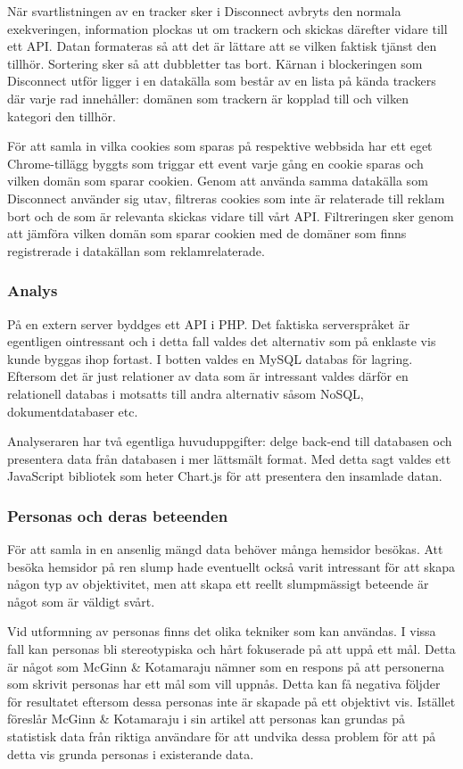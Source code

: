 \documentclass[a4paper,11pt]{article}
\begin{document}
{När svartlistningen av en tracker sker i Disconnect avbryts den normala exekveringen, information plockas ut om trackern och skickas därefter vidare till ett API. Datan formateras så att det är lättare att se vilken faktisk tjänst den tillhör. Sortering sker så att dubbletter tas bort. Kärnan i blockeringen som Disconnect utför ligger i en datakälla som består av en lista på kända trackers där varje rad innehåller: domänen som trackern är kopplad till och vilken kategori den tillhör. 

För att samla in vilka cookies som sparas på respektive webbsida har ett eget Chrome-tillägg byggts som triggar ett event varje gång en cookie sparas och vilken domän som sparar cookien. Genom att använda samma datakälla som Disconnect använder sig utav, filtreras cookies som inte är relaterade till reklam bort och de som är relevanta skickas vidare till vårt API. Filtreringen sker genom att jämföra vilken domän som sparar cookien med de domäner som finns registrerade i datakällan som reklamrelaterade.

\subsubsection{Analys}
På en extern server byddges ett API i PHP. Det faktiska serverspråket är egentligen  ointressant och i detta fall valdes det alternativ som på enklaste vis kunde byggas ihop fortast. I botten valdes en MySQL databas för lagring. Eftersom det är just relationer av data som är intressant valdes därför en relationell databas i motsatts till andra alternativ såsom NoSQL, dokumentdatabaser etc. 

Analyseraren har två egentliga huvuduppgifter: delge back-end till databasen och presentera data från databasen i mer lättsmält format. Med detta sagt valdes ett JavaScript bibliotek som heter Chart.js \cite{Downie} för att presentera den insamlade datan. 

\subsubsection{Personas och deras beteenden}
För att samla in en ansenlig mängd data behöver många hemsidor besökas. Att besöka hemsidor på ren slump hade eventuellt också varit intressant för att skapa någon typ av objektivitet, men att skapa ett reellt slumpmässigt beteende är något som är väldigt svårt.

Vid utformning av personas finns det olika tekniker som kan användas. I vissa fall kan personas bli stereotypiska och hårt fokuserade på att uppå ett mål. Detta är något som McGinn \& Kotamaraju \cite{McGinn} nämner som en respons på att personerna som skrivit personas har ett mål som vill uppnås. Detta kan få negativa följder för resultatet eftersom dessa personas inte är skapade på ett objektivt vis. Istället föreslår McGinn \& Kotamaraju \cite{McGinn} i sin artikel att personas kan grundas på statistisk data från riktiga användare för att undvika dessa problem för att på detta vis grunda personas i existerande data.

}
\end{document}
